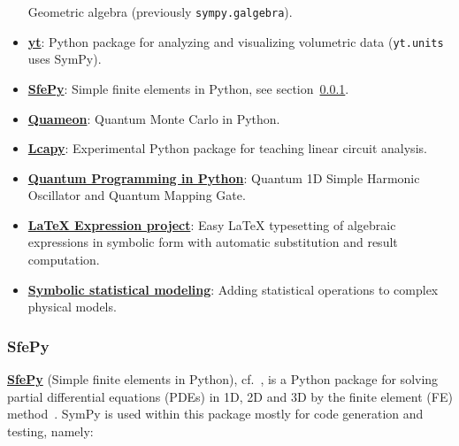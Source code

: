 \begin{itemize}
  Geometric algebra (previously \texttt{sympy.galgebra}).
\item
  \href{http://yt-project.org/}{\textbf{yt}}: Python package for
  analyzing and visualizing volumetric data (\texttt{yt.units} uses SymPy).
\item
  \href{http://sfepy.org/}{\textbf{SfePy}}: Simple finite elements in
  Python, see section~\ref{sfepy}.
\item
  \href{http://quameon.sourceforge.net/}{\textbf{Quameon}}: Quantum
  Monte Carlo in Python.
\item
  \href{http://lcapy.elec.canterbury.ac.nz/}{\textbf{Lcapy}}:
  Experimental Python package for teaching linear circuit analysis.
\item
  \href{http://digitalcommons.calpoly.edu/cgi/viewcontent.cgi?article=1072\&context=physsp/}{\textbf{Quantum
  Programming in Python}}: Quantum 1D Simple Harmonic Oscillator and
  Quantum Mapping Gate.
\item
  \href{http://mech.fsv.cvut.cz/~stransky/software/latexexpr/doc/}{\textbf{LaTeX
  Expression project}}: Easy \LaTeX{} typesetting of algebraic expressions
  in symbolic form with automatic substitution and result computation.
\item
  \href{https://www.researchgate.net/publication/260585491_Symbolic_Statistics_with_SymPy/}{\textbf{Symbolic
  statistical modeling}}: Adding statistical operations to complex
  physical models.
\end{itemize}

\subsubsection{SfePy}\label{sfepy}

\href{http://sfepy.org/}{\textbf{SfePy}} (Simple finite elements in Python),
cf.~\cite{cimrman2014sfepy}, is a Python package for solving partial
differential equations (PDEs) in 1D, 2D and 3D by the finite element (FE)
method~\cite{Zienkiewicz2013FEM}. SymPy is used within this package mostly for
code generation and testing, namely:

